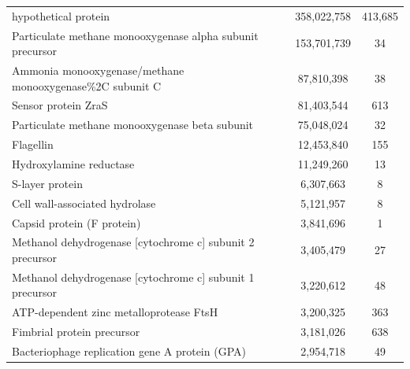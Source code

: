 \begin{singlespace}
\begin{longtable}{p{} cc}
\bottomrule
\endlastfoot
\endlastfoot
                                                                      hypothetical protein &                 358,022,758 &       413,685 \\
                                 Particulate methane monooxygenase alpha subunit precursor &                 153,701,739 &            34 \\
                                  Ammonia monooxygenase/methane monooxygenase\%2C subunit C &                  87,810,398 &            38 \\
                                                                       Sensor protein ZraS &                  81,403,544 &           613 \\
                                            Particulate methane monooxygenase beta subunit &                  75,048,024 &            32 \\
                                                                                 Flagellin &                  12,453,840 &           155 \\
                                                                   Hydroxylamine reductase &                  11,249,260 &            13 \\
                                                                           S-layer protein &                   6,307,663 &             8 \\
                                                            Cell wall-associated hydrolase &                   5,121,957 &             8 \\
                                                                Capsid protein (F protein) &                   3,841,696 &             1 \\
                                 Methanol dehydrogenase [cytochrome c] subunit 2 precursor &                   3,405,479 &            27 \\
                                 Methanol dehydrogenase [cytochrome c] subunit 1 precursor &                   3,220,612 &            48 \\
                                                   ATP-dependent zinc metalloprotease FtsH &                   3,200,325 &           363 \\
                                                                Fimbrial protein precursor &                   3,181,026 &           638 \\
                                            Bacteriophage replication gene A protein (GPA) &                   2,954,718 &            49 \\

\end{longtable}
\end{singlespace}
